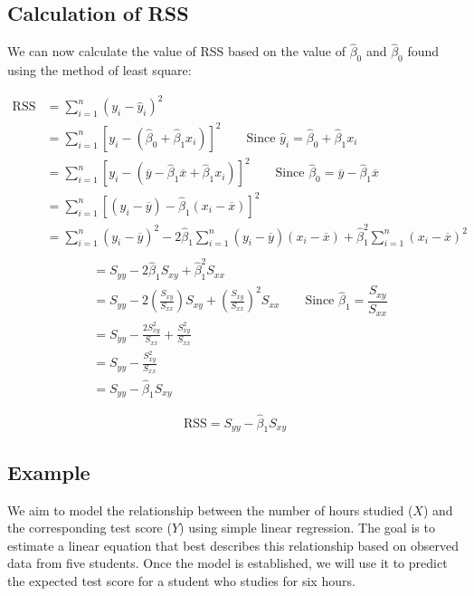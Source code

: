 \documentclass[twoside]{book}
\begin{document}
\subsection{Calculation of RSS}
We can now calculate the value of RSS based on the value of $\hat{\beta}_0$ and $\hat{\beta}_0$ found using the method of least square:

\begin{align*}
\text{RSS} &= \sum_{i=1}^{n} (y_i - \hat{y}_i)^2 \\
&= \sum_{i=1}^{n} \left[ y_i - (\hat{\beta}_0 + \hat{\beta}_1x_i) \right]^2 \qquad \text{Since }\hat{y}_i = \hat{\beta}_0 + \hat{\beta}_1x_i\\
&= \sum_{i=1}^{n} \left[ y_i - (\overline{y} - \hat{\beta}_1 \overline{x} + \hat{\beta}_1x_i) \right]^2 \qquad \text{Since }\hat{\beta}_0 = \overline{y} - \hat{\beta}_1 \overline{x}\\
&= \sum_{i=1}^{n} \left[ (y_i - \overline{y}) - \hat{\beta}_1 (x_i - \overline{x}) \right]^2 \\
&= \sum_{i=1}^{n} (y_i - \overline{y})^2 - 2\hat{\beta}_1 \sum_{i=1}^{n} (y_i - \overline{y})(x_i - \overline{x}) + \hat{\beta}_1^2 \sum_{i=1}^{n} (x_i - \overline{x})^2 \\
\end{align*}
\begin{align*}
&= S_{yy} - 2\hat{\beta}_1 S_{xy} + \hat{\beta}_1^2 S_{xx}\\
&= S_{yy} - 2\left( \frac{S_{xy}}{S_{xx}} \right) S_{xy} + \left( \frac{S_{xy}}{S_{xx}} \right)^2 S_{xx} \qquad \text{Since }\hat{\beta}_1 = \dfrac{S_{xy}}{S_{xx}} \\
&= S_{yy} - \frac{2 S_{xy}^2}{S_{xx}} + \frac{S_{xy}^2}{S_{xx}} \\
&= S_{yy} - \frac{S_{xy}^2}{S_{xx}} \\
&= S_{yy} - \hat{\beta}_1 S_{xy}
\end{align*}

\begin{textbox}
    $$\text{RSS} = S_{yy} - \hat{\beta}_1 S_{xy}$$
\end{textbox}

\subsection{Example}

We aim to model the relationship between the number of hours studied (\(X\)) and the corresponding test score (\(Y\)) using simple linear regression. The goal is to estimate a linear equation that best describes this relationship based on observed data from five students. Once the model is established, we will use it to predict the expected test score for a student who studies for six hours.
\end{document}
